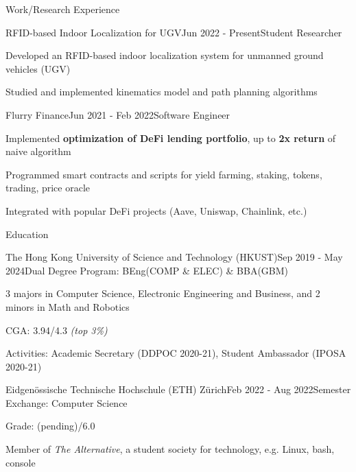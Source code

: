 \documentclass{resume}
\begin{document}
\begin{rSection}{Work/Research Experience}
    
    \begin{rSubsection}{RFID-based Indoor Localization for UGV}{Jun 2022 - Present}{Student Researcher}{}
        \item Developed an RFID-based indoor localization system for unmanned ground vehicles (UGV)
        \item Studied and implemented kinematics model and path planning algorithms
    \end{rSubsection}
    
    \begin{rSubsection}{Flurry Finance}{Jun 2021 - Feb 2022}{Software Engineer}{}
        \item Implemented \textbf{optimization of DeFi lending portfolio}, up to \textbf{2x return} of naive algorithm
        \item Programmed smart contracts and scripts for yield farming, staking, tokens, trading, price oracle
        \item Integrated with popular DeFi projects (Aave, Uniswap, Chainlink, etc.)
    \end{rSubsection}
    
\end{rSection}

\begin{rSection}{Education}

    \begin{rSubsection}{The Hong Kong University of Science and Technology (HKUST)}{Sep 2019 - May 2024}{Dual Degree Program: BEng(COMP \& ELEC) \& BBA(GBM)}{}
        \item 3 majors in Computer Science, Electronic Engineering and Business, and 2 minors in Math and Robotics
        \item CGA: 3.94/4.3 \emph{(top 3\%)}
        \item Activities: Academic Secretary (DDPOC 2020-21), Student Ambassador (IPOSA 2020-21)
    \end{rSubsection}

    \begin{rSubsection}{Eidgenössische Technische Hochschule (ETH) Zürich}{Feb 2022 - Aug 2022}{Semester Exchange: Computer Science}{}
        \item Grade: (pending)/6.0
        \item Member of \emph{The Alternative}, a student society for technology, e.g. Linux, bash, console
    \end{rSubsection}

\end{rSection}
\end{document}
